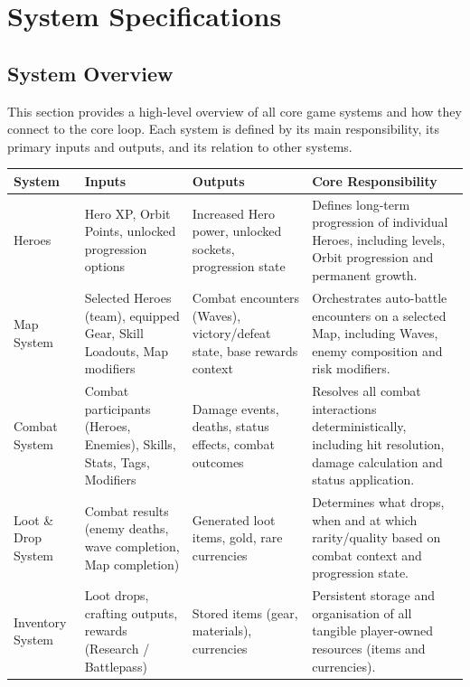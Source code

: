 \section{System Specifications}
\label{sec:system-specifications}

\subsection{System Overview}

This section provides a high-level overview of all core game systems and how they connect to the core loop. 
Each system is defined by its main responsibility, its primary inputs and outputs, and its relation to other systems.

\begin{tabular}{p{1.5cm}p{4.5cm}p{4.5cm}p{5cm}}
	\textbf{System} & \textbf{Inputs} & \textbf{Outputs} & \textbf{Core Responsibility} \\
	\hline
	Heroes
	& Hero XP, Orbit Points, unlocked progression options
	& Increased Hero power, unlocked sockets, progression state
	& Defines long-term progression of individual Heroes, including levels, Orbit progression and permanent growth. \\
	\hline
	
	Map System
	& Selected Heroes (team), equipped Gear, Skill Loadouts, Map modifiers
	& Combat encounters (Waves), victory/defeat state, base rewards context
	& Orchestrates auto-battle encounters on a selected Map, including Waves, enemy composition and risk modifiers. \\
	\hline
	
	Combat System
	& Combat participants (Heroes, Enemies), Skills, Stats, Tags, Modifiers
	& Damage events, deaths, status effects, combat outcomes
	& Resolves all combat interactions deterministically, including hit resolution, damage calculation and status application. \\
	\hline
	
	Loot \& Drop System
	& Combat results (enemy deaths, wave completion, Map completion)
	& Generated loot items, gold, rare currencies
	& Determines what drops, when and at which rarity/quality based on combat context and progression state. \\
	\hline
	
	Inventory System
	& Loot drops, crafting outputs, rewards (Research / Battlepass)
	& Stored items (gear, materials), currencies
	& Persistent storage and organisation of all tangible player-owned resources (items and currencies). \\
	\hline
	

\end{tabular}
